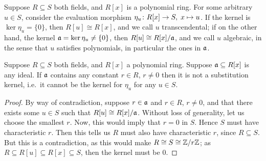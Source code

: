 \begin{definition}
    Suppose \(R \subseteq S\) both fields,
    and \(R[x]\) is a polynomial ring.
    For some arbitrary \(u \in S\),
    consider the evaluation morphism \(\eta_u\colon R[x]\to S,\;x\mapsto u\).
    If the kernel is \(\ker\eta_u = \{0\}\),
    then \(R[u] \cong R[x]\), and we call \(u\) transcendental;
    if on the other hand, the kernel \(\mathfrak{a} = \ker\eta_u \neq \{0\}\),
    then \(R[u] \cong R[x]/\mathfrak{a}\), and we call \(u\) algebraic,
    in the sense that \(u\) satisfies polynomials,
    in particular the ones in \(\mathfrak{a}\).
\end{definition}

\begin{theorem}
    Suppose \(R \subseteq S\) both fields,
    and \(R[x]\) a polynomial ring.
    Suppose \(\mathfrak{a} \subseteq R[x]\) is any ideal.
    If \(\mathfrak{a}\) contains any constant \(r \in R\), \(r \neq 0\)
    then it is not a substitution kernel,
    i.e.\ it cannot be the kernel for \(\eta_u\) for any \(u \in S\).
\end{theorem}
\begin{proof}
    By way of contradiction, suppose \(r \in \mathfrak{a}\) and \(r \in R\), \(r \neq 0\),
    and that there exists some \(u \in S\)
    such that \(R[u] \cong R[x]/\mathfrak{a}\).
    Without loss of generality, let us choose the smallest \(r\).
    Now, this would imply that \(r = 0\) in \(S\).
    Hence \(S\) must have characteristic \(r\).
    Then this tells us \(R\) must also have characteristic \(r\),
    since \(R \subseteq S\).
    But this is a contradiction,
    as this would make \(R \cong S \cong \mathbb{Z}/r\mathbb{Z}\);
    as \(R \subseteq R[u] \subseteq R[x] \subseteq S\),
    then the kernel must be \(0\).
\end{proof}

